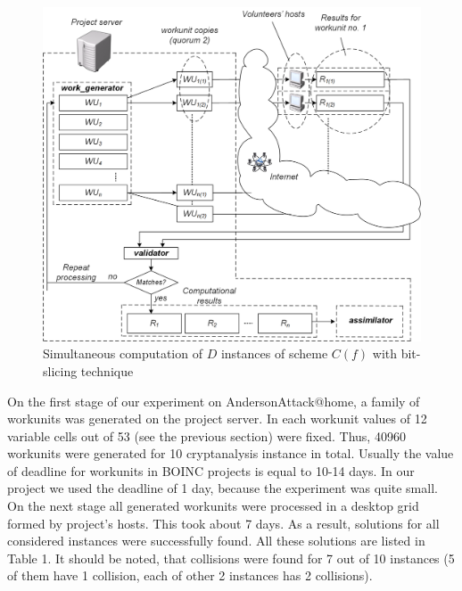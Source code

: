 \documentclass[runningheads,a4paper]{llncs}[2015/06/24]
\begin{document}
\begin{figure} \includegraphics[width=\linewidth]{./boinc.png}
	\caption{Simultaneous computation of $D$ instances of scheme $C(f)$ with
	bit-slicing technique} \label{fig:a51gen} 
\end{figure}

On the first stage of our experiment on AndersonAttack@home, a family of
workunits was generated on the project server. In each workunit values of 12
variable cells out of 53 (see the previous section) were fixed.  Thus, 40960
workunits were generated for 10 cryptanalysis instance in total. Usually the
value of deadline for workunits in BOINC projects is equal to 10-14 days. In
our project we used the deadline of 1 day, because the experiment was quite
small.  On the next stage all generated workunits were processed in a desktop
grid formed by project’s hosts. This took about 7 days. As a result, solutions
for all considered instances were successfully found. All these solutions are
listed in Table 1. It should be noted, that collisions were found for 7 out of
10 instances (5 of them have 1 collision, each of other 2 instances has 2
collisions).
\end{document}
